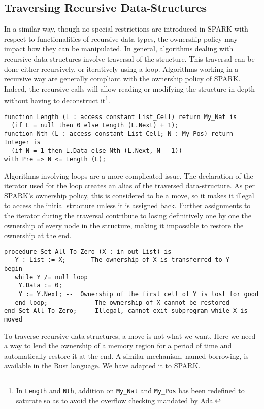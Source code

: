 \documentclass[runningheads]{llncs}
\begin{document}
\subsection{Traversing Recursive Data-Structures}
In a similar way, though no special restrictions are introduced in SPARK with respect to functionalities of recursive data-types, the ownership policy may impact how they can be manipulated. In general, algorithms dealing with recursive data-structures involve traversal of the structure. This traversal can be done either recursively, or iteratively using a loop. Algorithms working in a recursive way are generally compliant with the ownership policy of SPARK. Indeed, the recursive calls will allow reading or modifying the structure in depth without having to deconstruct it\footnote{In \texttt{Length} and \texttt{Nth}, addition on \texttt{My\_Nat} and \texttt{My\_Pos} has been redefined to saturate so as to avoid the overflow checking mandated by Ada.}.
\begin{lstlisting}
function Length (L : access constant List_Cell) return My_Nat is
  (if L = null then 0 else Length (L.Next) + 1);
function Nth (L : access constant List_Cell; N : My_Pos) return Integer is
  (if N = 1 then L.Data else Nth (L.Next, N - 1))
with Pre => N <= Length (L);
\end{lstlisting}
Algorithms involving loops are a more complicated issue. The declaration of the iterator used for the loop creates an alias of the traversed data-structure. As per SPARK’s ownership policy, this is considered to be a move, so it makes it illegal to access the initial structure unless it is assigned back. Further assignments to the iterator during the traversal contribute to losing definitively one by one the ownership of every node in the structure, making it impossible to restore the ownership at the end.
\begin{lstlisting}
procedure Set_All_To_Zero (X : in out List) is
   Y : List := X;    -- The ownership of X is transferred to Y
begin
   while Y /= null loop
  	Y.Data := 0;
  	Y := Y.Next; --  Ownership of the first cell of Y is lost for good
   end loop;         --  The ownership of X cannot be restored
end Set_All_To_Zero; --  Illegal, cannot exit subprogram while X is moved
\end{lstlisting}
To traverse recursive data-structures, a move is not what we want. Here we need a way to lend the ownership of a memory region for a period of time and automatically restore it at the end. A similar mechanism, named borrowing, is available in the Rust language. We have adapted it to SPARK.
\end{document}
